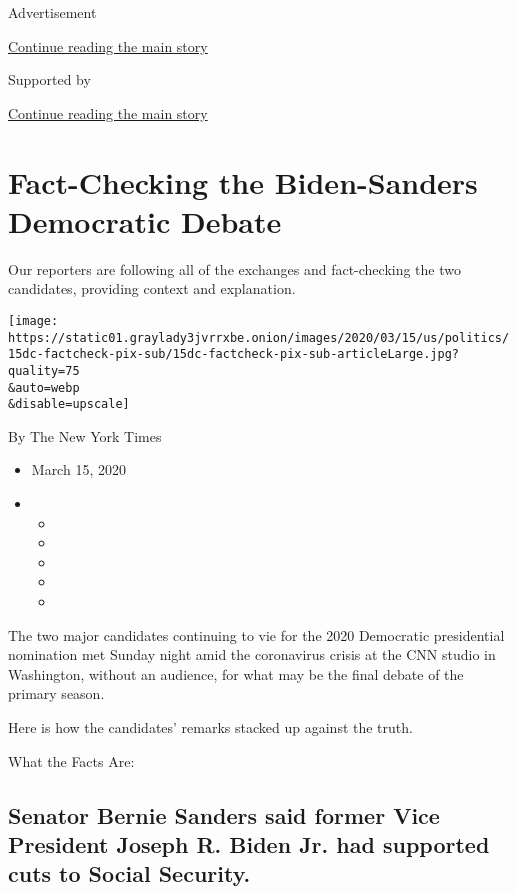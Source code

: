 Advertisement

\protect\hyperlink{after-top}{Continue reading the main story}

Supported by

\protect\hyperlink{after-sponsor}{Continue reading the main story}

\hypertarget{fact-checking-the-biden-sanders-democratic-debate}{%
\section{Fact-Checking the Biden-Sanders Democratic
Debate}\label{fact-checking-the-biden-sanders-democratic-debate}}

Our reporters are following all of the exchanges and fact-checking the
two candidates, providing context and explanation.

\texttt{[image: https://static01.graylady3jvrrxbe.onion/images/2020/03/15/us/politics/15dc-factcheck-pix-sub/15dc-factcheck-pix-sub-articleLarge.jpg?quality=75\\\&auto=webp\\\&disable=upscale]}

By The New York Times

\begin{itemize}
\item
  March 15, 2020
\item
  \begin{itemize}
  \item
  \item
  \item
  \item
  \item
  \end{itemize}
\end{itemize}

The two major candidates continuing to vie for the 2020 Democratic
presidential nomination met Sunday night amid the coronavirus crisis at
the CNN studio in Washington, without an audience, for what may be the
final debate of the primary season.

Here is how the candidates' remarks stacked up against the truth.

What the Facts Are:

\hypertarget{senator-bernie-sanders-said-former-vice-president-joseph-r-biden-jr-had-supported-cuts-to-social-security}{%
\subsection{Senator Bernie Sanders said former Vice President Joseph R.
Biden Jr. had supported cuts to Social
Security.}\label{senator-bernie-sanders-said-former-vice-president-joseph-r-biden-jr-had-supported-cuts-to-social-security}}

